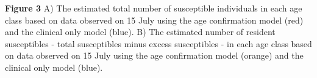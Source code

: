 \textbf{Figure 3} A) The estimated total number of susceptible
individuals in each age class based on data observed on 15 July using
the age confirmation model (red) and the clinical only model (blue).
B) The estimated number of resident susceptibles - total susceptibles
minus excess susceptibles - in each age class based on data observed on
15 July using the age confirmation model (orange) and the clinical only
model (blue).
